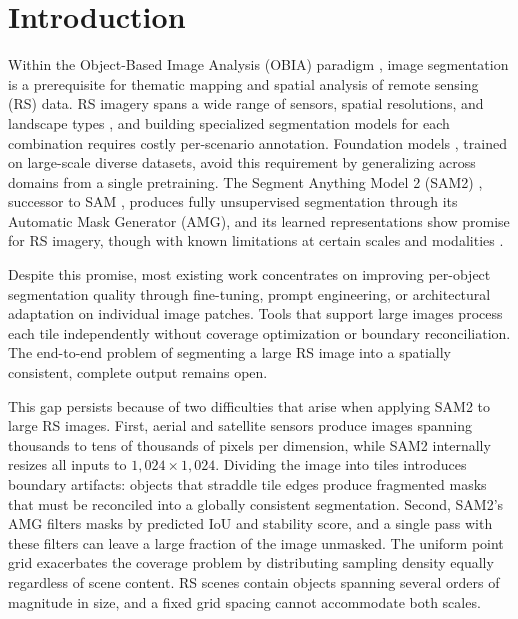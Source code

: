\documentclass[review,11pt,authoryear]{elsarticle}
\begin{document}
\linenumbers

\section{Introduction}
\label{sec:introduction}

Within the Object-Based Image Analysis (OBIA) paradigm \citep{blaschke2010obia, hay2008geobia, blaschke2014geobia}, image segmentation is a prerequisite for thematic mapping and spatial analysis of remote sensing (RS) data. RS imagery spans a wide range of sensors, spatial resolutions, and landscape types \citep{zhu2017deep_rs, li2024dl_seg_review}, and building specialized segmentation models for each combination requires costly per-scenario annotation. Foundation models \citep{bommasani2021foundation, xiao2025foundation_rs}, trained on large-scale diverse datasets, avoid this requirement by generalizing across domains from a single pretraining. The Segment Anything Model 2 (SAM2) \citep{ravi2024sam2}, successor to SAM \citep{kirillov2023segment}, produces fully unsupervised segmentation through its Automatic Mask Generator (AMG), and its learned representations show promise for RS imagery, though with known limitations at certain scales and modalities \citep{chen2024rsprompter, wang2024samrs, ren2024segment_anything_everywhere, osco2023sam_rs_review}.

Despite this promise, most existing work concentrates on improving per-object segmentation quality through fine-tuning, prompt engineering, or architectural adaptation on individual image patches. Tools that support large images process each tile independently without coverage optimization or boundary reconciliation. The end-to-end problem of segmenting a large RS image into a spatially consistent, complete output remains open.

This gap persists because of two difficulties that arise when applying SAM2 to large RS images. First, aerial and satellite sensors produce images spanning thousands to tens of thousands of pixels per dimension, while SAM2 internally resizes all inputs to $1{,}024 \times 1{,}024$. Dividing the image into tiles introduces boundary artifacts: objects that straddle tile edges produce fragmented masks that must be reconciled into a globally consistent segmentation. Second, SAM2's AMG filters masks by predicted IoU and stability score, and a single pass with these filters can leave a large fraction of the image unmasked. The uniform point grid exacerbates the coverage problem by distributing sampling density equally regardless of scene content. RS scenes contain objects spanning several orders of magnitude in size, and a fixed grid spacing cannot accommodate both scales.
\end{document}
